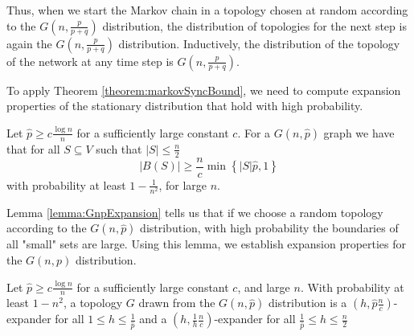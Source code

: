Thus, when we start the Markov chain in a topology chosen at random according to the $G(n, \frac{p}{p+q})$ distribution, the distribution of topologies for the next step is again the $G(n, \frac{p}{p+q})$ distribution. Inductively, the distribution of the topology of the network at any time step is $G(n, \frac{p}{p+q})$.

To apply Theorem \ref{theorem:markovSyncBound}, we need to compute expansion properties of the stationary distribution that hold with high probability.

\begin{lemma}\label{lemma:GnpExpansion}
	Let $\hat{p} \geq c\frac{\log n}{n}$ for a sufficiently large constant $c$. For a $G(n, \hat{p})$ graph we have that for all $S \subseteq V$ such that $|S| \leq \frac{n}{2}$
	$$
		|B(S)| \geq \frac{n}{c} \min \left\{ |S|\hat{p}, 1 \right\} 
	$$
	with probability at least $1 - \frac{1}{n^2}$, for large $n$. 
\end{lemma}


Lemma \ref{lemma:GnpExpansion} tells us that if we choose a random topology according to the $G(n, \hat{p})$ distribution, with high probability the boundaries of all "small" sets are large. Using this lemma, we establish expansion properties for the $G(n,p)$ distribution.


\begin{lemma}
	Let $\hat{p} \geq c\frac{\log n}{n}$ for a sufficiently large constant $c$, and large $n$. With probability at least $1- n^2$, a topology $G$ drawn from the $G(n, \hat{p})$ distribution is a $(h, \hat{p}\frac{n}{c})$-expander for all $1 \leq h \leq \frac{1}{\hat{p}}$ and a $(h, \frac{1}{h}\frac{n}{c})$-expander for all $\frac{1}{\hat{p}} \leq h \leq \frac{n}{2}$
\end{lemma}

